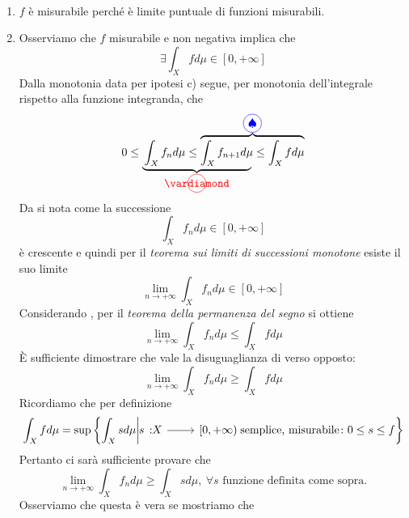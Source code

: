 \begin{demonstrationcaputwt}~
	\begin{enumerate}[label=\Roman*]
		\item $f$ è misurabile perché è limite puntuale di funzioni misurabili.
		\item Osserviamo che $f$ misurabile e non negativa implica che
		\begin{equation*}
			\exists\int_Xfd\mu\in\left[0,+\infty\right]
		\end{equation*}
		Dalla monotonia data per ipotesi c) segue, per monotonia dell'integrale rispetto alla funzione integranda, che
	\begin{equation*}
		0\leq\lefteqn{\underbrace{\phantom{\int_Xf_nd\mu\leq\int_Xf_{n+1}d\mu}}_{\circled[red]{\vardiamond}}}\int_Xf_nd\mu\leq
		\overbrace{\int_Xf_{n+1}d\mu\leq \int_Xfd\mu}^{\circled[blue]{\spadesuit}}
	\end{equation*}
		Da \circled[red]{\vardiamond} si nota come la successione
	\begin{equation*}
		\int_Xf_nd\mu\in\left[0,+\infty\right]
	\end{equation*}
		è crescente e quindi per il \textit{teorema sui limiti di successioni monotone} esiste il suo limite
\begin{equation*}
	\lim_{n\to+\infty}\int_Xf_nd\mu\in\left[0,+\infty\right]
\end{equation*}
Considerando \circled[blue]{\spadesuit}, per il \textit{teorema della permanenza del segno} si ottiene
\begin{equation*}
	\lim_{n\to+\infty}\int_Xf_nd\mu\leq \int_Xfd\mu
\end{equation*}
È sufficiente dimostrare che vale la disuguaglianza di verso opposto:
\begin{equation*}
	\lim_{n\to+\infty}\int_Xf_nd\mu\geq \int_Xfd\mu
\end{equation*}
Ricordiamo che per definizione
\begin{equation*}
	\int_Xfd\mu=\sup\left\{\int_Xsd\mu\middle| \funz{s}{X}{\left[0,+\infty\right)}\text{ semplice, misurabile}\colon0\leq s\leq f\right\}
\end{equation*}
Pertanto ci sarà sufficiente provare che
\begin{equation*}
	\lim_{n\to+\infty}\int_Xf_nd\mu\geq \int_Xsd\mu,\ \forall s\text{ funzione definita come sopra.}
\end{equation*}
Osserviamo che questa è vera se mostriamo che
\begin{equation*}

\end{equation*}
\end{enumerate}
\end{demonstrationcaputwt}
